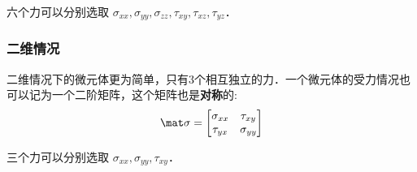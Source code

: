 六个力可以分别选取 $\sigma_{xx}, \sigma_{yy},\sigma_{zz}, \tau_{xy}, \tau_{xz},  \tau_{yz}$．

\subsubsection{二维情况}
二维情况下的微元体更为简单，只有3个相互独立的力．一个微元体的受力情况也可以记为一个二阶矩阵，这个矩阵也是\textbf{对称}的:
\begin{equation}
\mat \sigma=
\begin{bmatrix}
\sigma_{xx} & \tau_{xy}\\
\tau_{yx} & \sigma_{yy}\\
\end{bmatrix}
\end{equation}

三个力可以分别选取 $\sigma_{xx}, \sigma_{yy}, \tau_{xy}$．